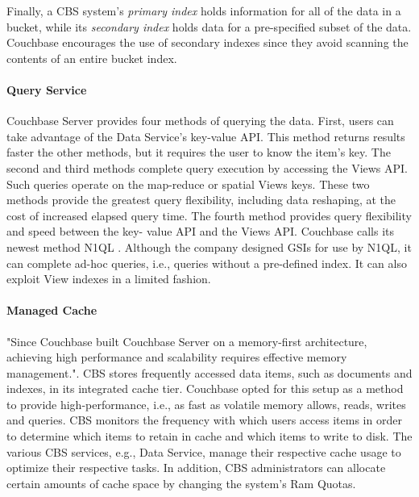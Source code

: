 \documentclass[9pt,twocolumn,twoside]{../../styles/osajnl}
\begin{document}
Finally, a CBS system's \textit{primary index} holds information for all of the data in a bucket, while its \textit{secondary index} holds data for a pre-specified subset of the data. Couchbase encourages the use of secondary indexes since they avoid scanning the contents of an entire bucket index.

\paragraph{Query Service} Couchbase Server provides four methods of querying the data.  First, users can take advantage of the Data Service's key-value API.  This method returns results faster the other methods, but it requires the user to know the item's key.  The second and third methods complete query execution by accessing the Views API.  Such queries operate on the map-reduce or spatial Views keys.  These two methods provide the greatest query flexibility, including data reshaping, at the cost of increased elapsed query time.  The fourth method provides query flexibility and speed between the key- value API and the Views API.  Couchbase calls its newest method N1QL \cite{www-viewsindexing-cbsinc}. Although the company designed GSIs for use by N1QL, it can complete ad-hoc queries, i.e., queries without a pre-defined index. It can also exploit View indexes in a limited fashion.

\paragraph{Managed Cache} "Since Couchbase built Couchbase Server on a
memory-first architecture, achieving high performance and scalability requires effective memory management."\cite{www-cachinglayer-cbsinc}.  CBS stores frequently accessed data items, such as documents and indexes, in its integrated cache tier.  Couchbase opted for this setup as a method to provide high-performance, i.e., as fast as volatile memory allows, reads, writes and queries.  CBS monitors the frequency with which users access items in order to determine which items to retain in cache and which items to write to disk.  The various CBS services, e.g., Data Service, manage their respective cache usage to optimize their respective tasks. In addition, CBS administrators can allocate certain amounts of cache space by changing the system's Ram Quotas.  \cite{www-cachinglayer-cbsinc}
\end{document}
